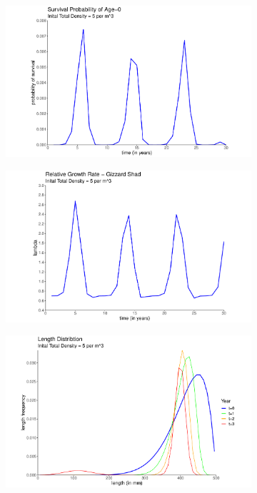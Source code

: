\documentclass[11pt,oneside]{amsart}
\theoremstyle{definition}
\begin{document}
\begin{figure}
\begin{subfigure}[b]{.3\textwidth}
     \caption{}
\label{}  
\end{subfigure} \\
\begin{subfigure}[b]{.3\textwidth}
  \includegraphics[width=\textwidth]{figures/Figure5d.pdf}
   \caption{}
  \label{}
\end{subfigure}
\begin{subfigure}[b]{.3\textwidth}
   \includegraphics[width=\textwidth]{figures/Figure5e.pdf}
     \caption{}
\label{}
\end{subfigure}
\begin{subfigure}[b]{.3\textwidth}
   \includegraphics[width=\textwidth]{figures/Figure5f.pdf}

\end{subfigure}
\end{figure}
\end{document}
